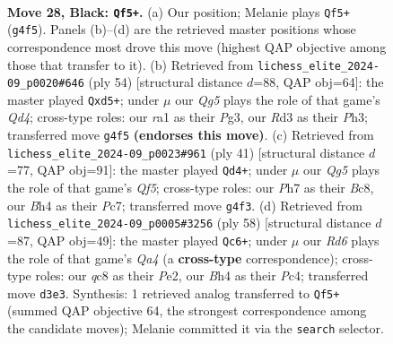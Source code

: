 \documentclass[11pt]{article}
\begin{document}
\clearpage

\begin{figure}[p]\centering
\begin{subfigure}{0.46\textwidth}\centering
\resizebox{\linewidth}{!}{%
\newchessgame
\chessboard[
  setfen={2Q5/pp1n2kp/7p/1P6/3P2qb/3r4/4N1B1/R4K1R b - - 3 28},
  showmover=false,
  pgfstyle=straightmove, color=movearrow, markmove={g4-f5}
]}
\caption{}
\end{subfigure}\hfill
\begin{subfigure}{0.46\textwidth}\centering
\resizebox{\linewidth}{!}{%
\newchessgame
\chessboard[
  setfen={2r3k1/pp5p/5qpB/3bN3/3Q4/6PP/P4P2/6K1 w - - 0 28},
  showmover=false,
  pgfstyle=straightmove, color=movearrow, markmove={d4-d5}
]}
\caption{}
\end{subfigure}
\\[4pt]
\begin{subfigure}{0.46\textwidth}\centering
\resizebox{\linewidth}{!}{%
\newchessgame
\chessboard[
  setfen={r1b5/ppp1k1bQ/6p1/3p2P1/2B2q2/8/P2N2P1/1R4K1 b - - 1 21},
  showmover=false,
  pgfstyle=straightmove, color=movearrow, markmove={f4-d4}
]}
\caption{}
\end{subfigure}\hfill
\begin{subfigure}{0.46\textwidth}\centering
\resizebox{\linewidth}{!}{%
\newchessgame
\chessboard[
  setfen={r1k1N2r/p5b1/6p1/6B1/Q1P5/P2n2Nq/4P2P/6K1 w - - 4 30},
  showmover=false,
  pgfstyle=straightmove, color=movearrow, markmove={a4-c6}
]}
\caption{}
\end{subfigure}
\caption{\textbf{Move 28, Black: \texttt{Qf5+}.} (a) Our position; Melanie plays \texttt{Qf5+} (\texttt{g4f5}). Panels (b)--(d) are the retrieved master positions whose correspondence most drove this move (highest QAP objective among those that transfer to it). (b) Retrieved from \texttt{lichess\_elite\_2024-09\_p0020\#646} (ply 54) [structural distance $d$=88, QAP obj=64]: the master played \texttt{Qxd5+}; under $\mu$ our \emph{Qg5} plays the role of that game's \emph{Qd4}; cross-type roles: our \emph{r}a1 as their \emph{P}g3, our \emph{R}d3 as their \emph{P}h3; transferred move \texttt{g4f5} \textbf{(endorses this move)}. (c) Retrieved from \texttt{lichess\_elite\_2024-09\_p0023\#961} (ply 41) [structural distance $d$=77, QAP obj=91]: the master played \texttt{Qd4+}; under $\mu$ our \emph{Qg5} plays the role of that game's \emph{Qf5}; cross-type roles: our \emph{P}h7 as their \emph{B}c8, our \emph{B}h4 as their \emph{P}c7; transferred move \texttt{g4f3}. (d) Retrieved from \texttt{lichess\_elite\_2024-09\_p0005\#3256} (ply 58) [structural distance $d$=87, QAP obj=49]: the master played \texttt{Qc6+}; under $\mu$ our \emph{Rd6} plays the role of that game's \emph{Qa4} (a \textbf{cross-type} correspondence); cross-type roles: our \emph{q}c8 as their \emph{P}e2, our \emph{B}h4 as their \emph{P}c4; transferred move \texttt{d3e3}. Synthesis: 1 retrieved analog transferred to \texttt{Qf5+} (summed QAP objective 64, the strongest correspondence among the candidate moves); Melanie committed it via the \texttt{search} selector.}
\label{fig:thought-m55}
\end{figure}
\end{document}
